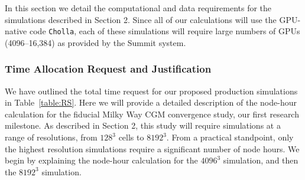 \documentclass[11pt,letterpaper,english]{article}
\begin{document}



In this section we detail the computational and data requirements for the simulations described in Section 2. Since all of our calculations will use the GPU-native code {\tt Cholla}, each of these simulations will require large numbers of GPUs (4096--16,384) as provided by the Summit system. 


\subsubsection{Time Allocation Request and Justification}

We have outlined the total time request for our proposed production simulations in Table~\ref{table:RS}. Here we will provide a detailed description of the node-hour calculation for the fiducial Milky Way CGM convergence study, our first research milestone. As described in Section 2, this study will require simulations at a range of resolutions, from $128^3$ cells to $8192^3$. From a practical standpoint, only the highest resolution simulations require a significant number of node hours. We begin by explaining the node-hour calculation for the $4096^3$ simulation, and then the $8192^3$ simulation.



\end{document}
